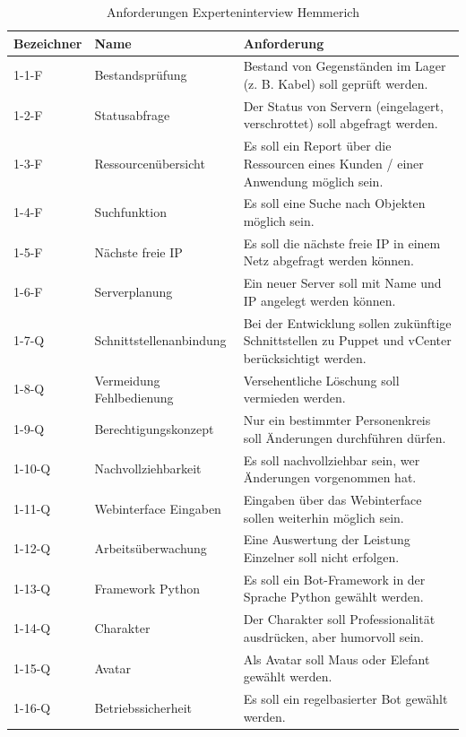 \begin{table}[H]
\centering
\begin{tabularx}{1\textwidth}{l|l|X}
  Bezeichner & Name & Anforderung \\\hline
  1-1-F  & Bestandsprüfung          & Bestand von Gegenständen im Lager (z. B. Kabel) soll geprüft werden.\\
  1-2-F  & Statusabfrage            & Der Status von Servern (eingelagert, verschrottet) soll abgefragt werden.\\
  1-3-F  & Ressourcenübersicht      & Es soll ein Report über die Ressourcen eines Kunden / einer Anwendung möglich sein.\\
  1-4-F  & Suchfunktion             & Es soll eine Suche nach Objekten möglich sein.\\
  1-5-F  & Nächste freie IP         & Es soll die nächste freie IP in einem Netz abgefragt werden können.\\
  1-6-F  & Serverplanung            & Ein neuer Server soll mit Name und IP angelegt werden können.\\
  1-7-Q  & Schnittstellenanbindung  & Bei der Entwicklung sollen zukünftige Schnittstellen zu Puppet und vCenter berücksichtigt werden.\\
  1-8-Q  & Vermeidung Fehlbedienung & Versehentliche Löschung soll vermieden werden.\\
  1-9-Q  & Berechtigungskonzept     & Nur ein bestimmter Personenkreis soll Änderungen durchführen dürfen.\\
  1-10-Q & Nachvollziehbarkeit      & Es soll nachvollziehbar sein, wer Änderungen vorgenommen hat.\\
  1-11-Q & Webinterface Eingaben    & Eingaben über das Webinterface sollen weiterhin möglich sein.\\
  1-12-Q & Arbeitsüberwachung       & Eine Auswertung der Leistung Einzelner soll nicht erfolgen. \\
  1-13-Q & Framework Python         & Es soll ein Bot-Framework in der Sprache Python gewählt werden.\\
  1-14-Q & Charakter                & Der Charakter soll Professionalität ausdrücken, aber humorvoll sein.\\
  1-15-Q & Avatar                   & Als Avatar soll Maus oder Elefant gewählt werden.\\
  1-16-Q & Betriebssicherheit       & Es soll ein regelbasierter Bot gewählt werden.\\
\end{tabularx}
\\\eigen
\caption{Anforderungen Experteninterview Hemmerich}
\label{tab:exphemm}
\end{table}


